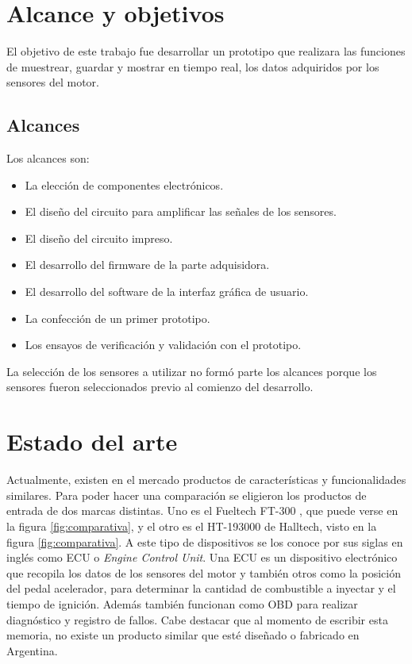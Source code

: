 \section{Alcance y objetivos}

El objetivo de este trabajo fue desarrollar un prototipo que realizara las funciones de muestrear, guardar y mostrar en tiempo real, los datos adquiridos por los sensores del motor.

\subsection{Alcances}

Los alcances son:
\begin{itemize}
\item La elección de componentes electrónicos.
\item El diseño del circuito para amplificar las señales de los sensores.
\item El diseño del circuito impreso.
\item El desarrollo del firmware de la parte adquisidora.
\item El desarrollo del software de la interfaz gráfica de usuario.
\item La confección de un primer prototipo.
\item Los ensayos de verificación y validación con el prototipo.
\end{itemize}

La selección de los sensores a utilizar no formó parte los alcances porque los sensores fueron seleccionados previo al comienzo del desarrollo.

\section{Estado del arte}

Actualmente, existen en el mercado productos de características y funcionalidades similares. Para poder hacer una comparación se eligieron los productos de entrada de dos marcas distintas. Uno es el Fueltech FT-300 \citep{ft-300}, que puede verse en la figura \ref{fig:comparativa},  y el otro es el HT-193000 \citep{ht-193000} de Halltech, visto en la figura \ref{fig:comparativa}. A este tipo de dispositivos se los conoce por sus siglas en inglés como ECU o \textit{Engine Control Unit}. Una ECU es un dispositivo electrónico que recopila los datos de los sensores del motor y también otros como la posición del pedal acelerador, para determinar la cantidad de combustible a inyectar y el tiempo de ignición. Además también funcionan como OBD para realizar diagnóstico y registro de fallos. Cabe destacar que al momento de escribir esta memoria, no existe un producto similar que esté diseñado o fabricado en Argentina.

